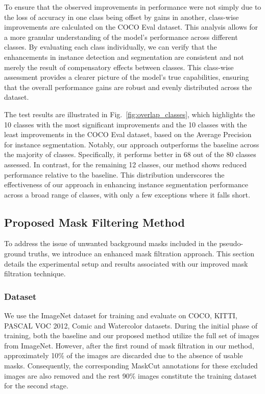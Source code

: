 To ensure that the observed improvements in performance were not simply due to the loss of accuracy in one class being offset by gains in another, class-wise improvements are calculated on the COCO Eval dataset. This analysis allows for a more granular understanding of the model’s performance across different classes. By evaluating each class individually, we can verify that the enhancements in instance detection and segmentation are consistent and not merely the result of compensatory effects between classes. This class-wise assessment provides a clearer picture of the model's true capabilities, ensuring that the overall performance gains are robust and evenly distributed across the dataset.

The test results are illustrated in Fig.~\ref{fig:overlap_classes}, which highlights the 10 classes with the most significant improvements and the 10 classes with the least improvements in the COCO Eval dataset, based on the Average Precision for instance segmentation. Notably, our approach outperforms the baseline across the majority of classes. Specifically, it performs better in 68 out of the 80 classes assessed. In contrast, for the remaining 12 classes, our method shows reduced performance relative to the baseline. This distribution underscores the effectiveness of our approach in enhancing instance segmentation performance across a broad range of classes, with only a few exceptions where it falls short.

\subsection{Proposed Mask Filtering Method}
\label{section:mask_refinement_experiment}
To address the issue of unwanted background masks included in the pseudo-ground truths, we introduce an enhanced mask filtration approach. This section details the experimental setup and results associated with our improved mask filtration technique.

\subsubsection{Dataset}
We use the ImageNet dataset for training and evaluate on COCO, KITTI, PASCAL VOC 2012, Comic and Watercolor datasets. During the initial phase of training, both the baseline and our proposed method utilize the full set of images from ImageNet. However, after the first round of mask filtration in our method, approximately 10\% of the images are discarded due to the absence of usable masks. Consequently, the corresponding MaskCut annotations for these excluded images are also removed and the rest 90\% images constitute the training dataset for the second stage.

